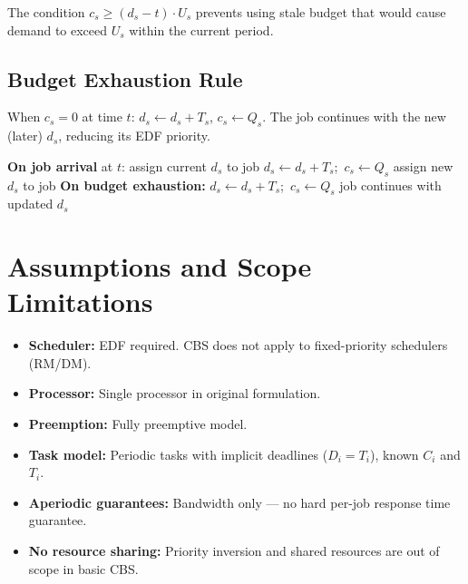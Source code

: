 \documentclass[conference]{IEEEtran}
\begin{document}
The condition $c_s \geq (d_s - t) \cdot U_s$ prevents using stale budget
that would cause demand to exceed $U_s$ within the current period.

\subsection{Budget Exhaustion Rule}
When $c_s = 0$ at time $t$:
$d_s \leftarrow d_s + T_s$, $c_s \leftarrow Q_s$.
The job continues with the new (later) $d_s$, reducing its EDF priority.

\begin{algorithm}
\caption{CBS decisions (simplified)}
\begin{algorithmic}[1]
\STATE \textbf{On job arrival} at $t$:
  \STATE assign current $d_s$ to job
\ELSE
  \STATE $d_s \leftarrow d_s + T_s$;\ $c_s \leftarrow Q_s$
  \STATE assign new $d_s$ to job
\ENDIF
\STATE \textbf{On budget exhaustion:}
\STATE $d_s \leftarrow d_s + T_s$;\ $c_s \leftarrow Q_s$
\STATE job continues with updated $d_s$
\end{algorithmic}
\end{algorithm}

\section{Assumptions and Scope Limitations}

\begin{itemize}
  \item \textbf{Scheduler:} EDF required. CBS does not apply to
        fixed-priority schedulers (RM/DM).
  \item \textbf{Processor:} Single processor in original formulation.
  \item \textbf{Preemption:} Fully preemptive model.
  \item \textbf{Task model:} Periodic tasks with implicit deadlines
        ($D_i = T_i$), known $C_i$ and $T_i$.
  \item \textbf{Aperiodic guarantees:} Bandwidth only --- no hard
        per-job response time guarantee.
  \item \textbf{No resource sharing:} Priority inversion and shared
        resources are out of scope in basic CBS.
\end{itemize}

\end{document}
